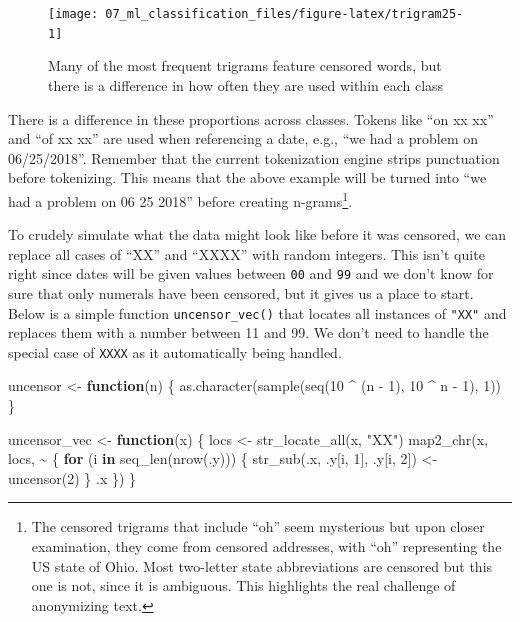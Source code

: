 \documentclass[
]{krantz}
\makeatletter
\newenvironment{Shaded}{\begin{snugshade}}{\end{snugshade}}
\newcommand{\ControlFlowTok}[1]{\textcolor[rgb]{0.13,0.29,0.53}{\textbf{#1}}}
\newcommand{\DecValTok}[1]{\textcolor[rgb]{0.00,0.00,0.81}{#1}}
\newcommand{\FunctionTok}[1]{\textcolor[rgb]{0.00,0.00,0.00}{#1}}
\newcommand{\NormalTok}[1]{#1}
\newcommand{\OtherTok}[1]{\textcolor[rgb]{0.56,0.35,0.01}{#1}}
\newcommand{\SpecialCharTok}[1]{\textcolor[rgb]{0.00,0.00,0.00}{#1}}
\newcommand{\StringTok}[1]{\textcolor[rgb]{0.31,0.60,0.02}{#1}}
\newenvironment{kframe}{%
\medskip{}
\setlength{\fboxsep}{.8em}
 \def\at@end@of@kframe{}%
 \ifinner\ifhmode%
  \def\at@end@of@kframe{\end{minipage}}%
  \begin{minipage}{\columnwidth}%
 \fi\fi%
 \def\FrameCommand##1{\hskip\@totalleftmargin \hskip-\fboxsep
 \colorbox{shadecolor}{##1}\hskip-\fboxsep
     \hskip-\linewidth \hskip-\@totalleftmargin \hskip\columnwidth}%
 \MakeFramed {\advance\hsize-\width
   \@totalleftmargin\z@ \linewidth\hsize
   \@setminipage}}%
 {\par\unskip\endMakeFramed%
 \at@end@of@kframe}
\renewenvironment{Shaded}{\begin{kframe}}{\end{kframe}}
\makeatother
\begin{document}
\begin{figure}

{\centering \texttt{[image: 07\_ml\_classification\_files/figure-latex/trigram25-1]} 

}

\caption{Many of the most frequent trigrams feature censored words, but there is a difference in how often they are used within each class}\label{fig:trigram25}
\end{figure}

There is a difference in these proportions across classes. Tokens like ``on xx xx'' and ``of xx xx'' are used when referencing a date, e.g., ``we had a problem on 06/25/2018''.
Remember that the current tokenization engine strips punctuation before tokenizing.
This means that the above example will be turned into ``we had a problem on 06 25 2018'' before creating n-grams\footnote{The censored trigrams that include ``oh'' seem mysterious but upon closer examination, they come from censored addresses, with ``oh'' representing the US state of Ohio. Most two-letter state abbreviations are censored but this one is not, since it is ambiguous. This highlights the real challenge of anonymizing text.}.

To crudely simulate what the data might look like before it was censored, we can replace all cases of ``XX'' and ``XXXX'' with random integers.
This isn't quite right since dates will be given values between \texttt{00} and \texttt{99} and we don't know for sure that only numerals have been censored, but it gives us a place to start.
Below is a simple function \texttt{uncensor\_vec()} that locates all instances of \texttt{"XX"} and replaces them with a number between 11 and 99.
We don't need to handle the special case of \texttt{XXXX} as it automatically being handled.

\begin{Shaded}
\begin{Highlighting}[]
\NormalTok{uncensor }\OtherTok{\textless{}{-}} \ControlFlowTok{function}\NormalTok{(n) \{}
  \FunctionTok{as.character}\NormalTok{(}\FunctionTok{sample}\NormalTok{(}\FunctionTok{seq}\NormalTok{(}\DecValTok{10} \SpecialCharTok{\^{}}\NormalTok{ (n }\SpecialCharTok{{-}} \DecValTok{1}\NormalTok{), }\DecValTok{10} \SpecialCharTok{\^{}}\NormalTok{ n }\SpecialCharTok{{-}} \DecValTok{1}\NormalTok{), }\DecValTok{1}\NormalTok{))}
\NormalTok{\}}

\NormalTok{uncensor\_vec }\OtherTok{\textless{}{-}} \ControlFlowTok{function}\NormalTok{(x) \{}
\NormalTok{  locs }\OtherTok{\textless{}{-}} \FunctionTok{str\_locate\_all}\NormalTok{(x, }\StringTok{"XX"}\NormalTok{)}
  \FunctionTok{map2\_chr}\NormalTok{(x, locs, }\SpecialCharTok{\textasciitilde{}}\NormalTok{ \{}
    \ControlFlowTok{for}\NormalTok{ (i }\ControlFlowTok{in} \FunctionTok{seq\_len}\NormalTok{(}\FunctionTok{nrow}\NormalTok{(.y))) \{}
      \FunctionTok{str\_sub}\NormalTok{(.x, .y[i, }\DecValTok{1}\NormalTok{], .y[i, }\DecValTok{2}\NormalTok{]) }\OtherTok{\textless{}{-}} \FunctionTok{uncensor}\NormalTok{(}\DecValTok{2}\NormalTok{)}
\NormalTok{    \}}
\NormalTok{    .x}
\NormalTok{  \})}
\NormalTok{\}}
\end{Highlighting}
\end{Shaded}
\end{document}
